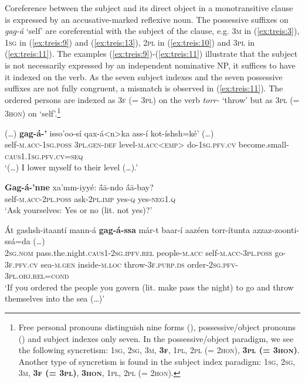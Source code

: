 \documentclass[output=paper]{langscibook}
\begin{document}
Coreference between the subject and its direct object in a monotransitive clause is expressed by an accusative-marked reflexive noun. The possessive suffixes on \textit{gag-á} ‘self’ are coreferential with the subject of the clause, e.g. \textsc{3m} in (\ref{ex:treis:3}), \textsc{1sg} in (\ref{ex:treis:9}) and (\ref{ex:treis:13}), \textsc{2pl} in (\ref{ex:treis:10}) and \textsc{3pl} in (\ref{ex:treis:11}). The examples (\ref{ex:treis:9})-(\ref{ex:treis:11}) illustrate that the subject is not necessarily expressed by an independent nominative NP, it suffices to have it indexed on the verb. As the seven subject indexes and the seven possessive suffixes are not fully congruent, a mismatch is observed in (\ref{ex:treis:11}). The ordered persons are indexed as \textsc{3f} (= \textsc{3pl)} on the verb \textit{torr-} ‘throw’ but as \textsc{3pl} (= \textsc{3hon)} on ‘self’.\footnote{Free personal pronouns distinguish nine forms (), possessive/object pronouns () and subject indexes only seven. In the possessive/object paradigm, we see the following syncretism: \textsc{1sg,} \textsc{2sg,} \textsc{3m}, \textbf{\textsc{3f}}, \textsc{1pl}, \textsc{2pl} (= \textsc{2hon)}, \textbf{\textsc{3pl (= 3hon)}}. Another type of syncretism is found in the subject index paradigm: \textsc{1sg}, \textsc{2sg}, \textsc{3m}, \textbf{\textsc{3f (= 3pl)}}, \textbf{\textsc{3hon}}, \textsc{1pl}, \textsc{2pl (= 2hon)}.}

\ea\label{ex:treis:9} 
\gll (…) \textbf{gag-á-’} isso’oo-sí qax-á<n>ka ass-í {kot-íshsh=ké’ (…)}\\
     {} self-\textsc{m.acc-1sg.poss} \textsc{3pl.gen-def} level-\textsc{m.acc<emp>} do-\textsc{1sg.pfv.cv} become.small-\textsc{caus1.1sg.pfv.cv=seq}\\
\glt ‘(…) I lower myself to their level (…).’ \citep[11]{Saint-Exupéry2018}\z

\ea\label{ex:treis:10} 
\gll \textbf{Gag-á-’nne} xa’mm-iyyé: \'{ā}ā-ndo \'{ā}ā-bay?\\
     self-\textsc{m.acc-2pl.poss} ask-\textsc{2pl.imp} yes-\textsc{q} yes-\textsc{neg1.q}\\
\glt ‘Ask yourselves: Yes or no (lit. not yes)?’ \citep[93]{Saint-Exupéry2018}\z

\ea\label{ex:treis:11} 
\gll Át gashsh-itaantí mann-á \textbf{gag-á-ssa} már-t baar-í aazéen torr-ítunta {azzaz-zoonti-ssá=da (…)}\\
     \textsc{2sg.nom} pass.the.night.\textsc{caus1-2sg.ipfv.rel} people-\textsc{m.acc} self-\textsc{m.acc-3pl.poss} go-\textsc{3f.pfv.cv} sea-\textsc{m.gen} inside-\textsc{m.loc} throw-\textsc{3f.purp.ds} order-\textsc{2sg.pfv-3pl.obj.rel=cond}\\
\glt ‘If you ordered the people you govern (lit. make pass the night) to go and throw themselves into the sea (…)’ \citep[38]{Saint-Exupéry2018}\z
\end{document}
